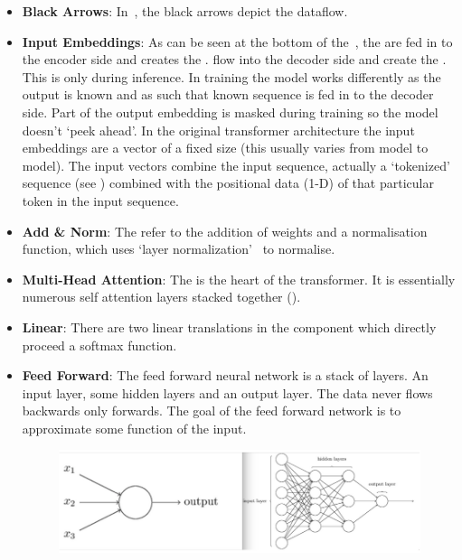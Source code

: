 \begin{itemize}
	\item \textbf{Black Arrows}: In~, the black arrows depict the dataflow.
	\item \textbf{Input Embeddings}: As can be seen at the bottom of the~, the  are fed in to the encoder side and creates the
	      .  flow into the decoder side and create the . This is only during inference. In training
	      the model works differently as the output is known and as such that known sequence is fed in to the decoder side. Part of the output embedding
	      is masked during training so the model doesn't `peek ahead'.
	      \bigbreak
	      In the original transformer architecture the input embeddings are a vector of a fixed size (this usually varies from model to model).
	      The input vectors combine the input sequence, actually a `tokenized' sequence (see ) combined with the positional data
	      (1-D) of that particular token in the input sequence.
	\item \textbf{Add \& Norm}: The  refer to the addition of weights and a normalisation function, which uses `layer normalization'~\autocite{vijayraniaDifferentNormalizationLayers2021} to normalise.
	\item \textbf{Multi-Head Attention}: The  is the heart of the transformer. It is essentially numerous self attention layers stacked together
	().
	\item\textbf{Linear}: There are two linear translations in the  component which directly proceed a softmax function.
	\item \textbf{Feed Forward}: The feed forward neural network is a stack of layers. An input layer, some hidden layers and an output layer.
	      The data never flows backwards only forwards. The goal of the feed forward network is to approximate some function of the input.
	      \begin{figure}[H]
		      \centering
		      \includegraphics[width=1\linewidth]{figures/feed_forward.png}

\end{figure}
\end{itemize}
